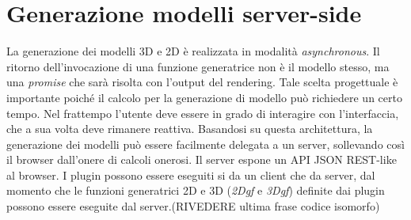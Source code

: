 \section{Generazione modelli server-side}
\label{sec:chapter_3_section_4}

\noindent
La generazione dei modelli 3D e 2D è realizzata in modalità \emph{asynchronous}.
Il ritorno dell'invocazione di una funzione generatrice non \`e il modello stesso,
ma una \emph{promise} che sarà risolta con l'output del rendering. Tale scelta progettuale \`e importante poich\'e il calcolo per la
generazione di modello pu\`o richiedere un certo tempo.
Nel frattempo l'utente deve essere in grado di interagire con l'interfaccia, che a sua volta deve rimanere reattiva.
Basandosi su questa architettura, la generazione dei modelli può essere facilmente delegata a un server,
sollevando così il browser dall'onere di calcoli onerosi. Il server espone un API JSON REST-like al browser.
I plugin possono essere eseguiti si da un client che da server, dal momento che le funzioni generatrici 2D e 3D (\emph{2Dgf} e \emph{3Dgf})
 definite dai plugin possono essere eseguite dal server.(RIVEDERE ultima frase codice isomorfo)


